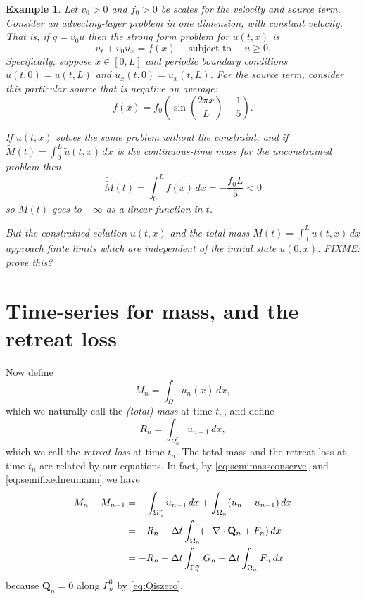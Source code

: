 \documentclass[final,leqno,onefignum,onetabnum]{siamltex1213bueler}
\newtheorem{example}{Example}
\newcommand\bQ{\mathbf{Q}}
\newcommand{\Div}{\nabla\cdot}
\begin{document}
\begin{example}  Let $v_0>0$ and $f_0>0$ be scales for the velocity and source term.  Consider an advecting-layer problem in one dimension, with constant velocity.  That is, if $q = v_0 u$ then the strong form problem for $u(t,x)$ is
\begin{equation}
u_t + v_0 u_x = f(x) \quad \text{ subject to } \quad u\ge 0.  \label{eq:ex:advectlayer}
\end{equation}
Specifically, suppose $x\in[0,L]$ and periodic boundary conditions $u(t,0)=u(t,L)$ and $u_x(t,0)=u_x(t,L)$.  For the source term, consider this particular source that is negative on average:
    $$f(x) = f_0 \left(\sin\left(\frac{2\pi x}{L}\right) - \frac{1}{5}\right).$$

If $\tilde u(t,x)$ solves the same problem without the constraint, and if $\tilde M(t) = \int_0^L \tilde u(t,x)\,dx$ is the continuous-time mass for the unconstrained problem then
    $$\dot{\tilde M}(t) = \int_0^L f(x)\,dx = -\frac{f_0 L}{5} < 0$$
so $\tilde M(t)$ goes to $-\infty$ as a linear function in $t$.

But the constrained solution $u(t,x)$ and the total mass $M(t) = \int_0^L u(t,x)\,dx$ approach finite limits which are independent of the initial state $u(0,x)$.  FIXME: prove this?
\end{example}


\section{Time-series for mass, and the retreat loss}  \label{sec:timeseries}

Now define
\begin{equation}
M_n = \int_\Omega u_n(x)\,dx, \label{eq:totalmassdefn}
\end{equation}
which we naturally call the \emph{(total) mass} at time $t_n$, and define
\begin{equation}
R_n = \int_{\Omega_n^r} u_{n-1}\,dx, \label{eq:retreatlossdefn}
\end{equation}
which we call the \emph{retreat loss} at time $t_n$.  The total mass and the retreat loss at time $t_n$ are related by our equations.  In fact, by \eqref{eq:semimassconserve} and \eqref{eq:semifixedneumann} we have
\begin{align}
M_n - M_{n-1} &=  - \int_{\Omega_n^r} u_{n-1}\,dx + \int_{\Omega_n} (u_n - u_{n-1})\,dx \label{eq:massstep} \\
   &= - R_n + \Delta t \int_{\Omega_n} (- \Div \bQ_n + F_n) \,dx \notag \\
   &= - R_n + \Delta t \int_{\Gamma_n^N} G_n + \Delta t \int_{\Omega_n} F_n\,dx \notag
\end{align}
because $\bQ_n=0$ along $\Gamma_n^0$ by \eqref{eq:Qiszero}.
\end{document}
